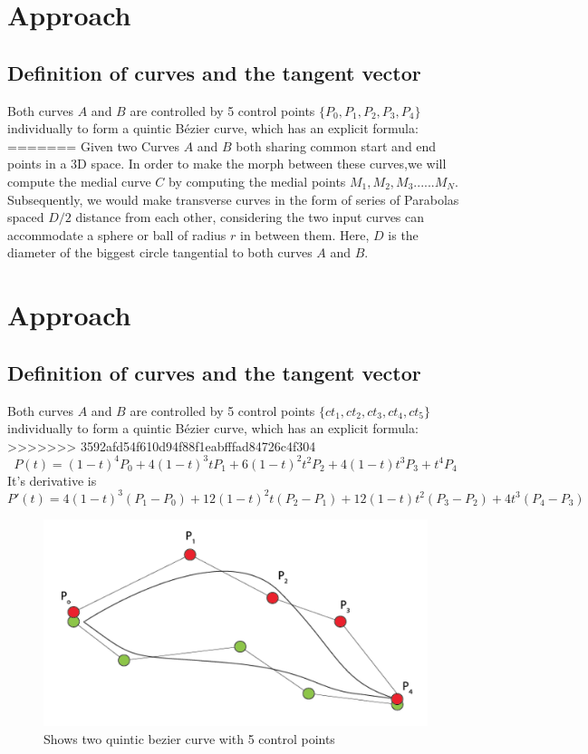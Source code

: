 \documentclass[twoside,11pt]{article}
\begin{document}
\section{Approach}
\subsection{Definition of curves and the tangent vector}
Both curves $A$ and $B$ are controlled by 5 control points  $\{P_0, P_1, P_2, P_3, P_4\}$ individually to form a quintic B\'ezier curve, which has an explicit formula:
=======
Given two Curves $ A $ and $ B $ both sharing common start and end points in a 3D space. In order to make the morph between these curves,we will compute the medial curve $ C $ by computing the medial points $ M_1, M_2, M_3 ......M_N $.
Subsequently, we would make transverse curves in the form of series of Parabolas spaced $ D/2 $ distance from each other, considering the two input curves can accommodate a sphere or ball of radius $ r $ in between them. Here, $D$ is the diameter of the biggest circle tangential to both curves $A$ and $B$.

\section{Approach}
\subsection{Definition of curves and the tangent vector}
Both curves $A$ and $B$ are controlled by 5 control points  $\{ct_1, ct_2, ct_3, ct_4, ct_5\}$ individually to form a quintic B\'ezier curve, which has an explicit formula:
>>>>>>> 3592afd54f610d94f88f1eabfffad84726c4f304
\begin{equation}
  \label{eq:1}
  P(t) = (1-t)^4 P_0 + 4(1-t)^3t P_1 + 6(1-t)^2 t^2 P_2 + 4(1-t)t^3 P_3 + t^4 P_4 
\end{equation}
It's derivative is 
\begin{equation}
  \label{eq:2}
  P'(t) = 4(1-t)^3 (P_1 - P_0) + 12(1-t)^2t (P_2 - P_1) + 12(1-t)t^2 (P_3 - P_2) + 4t^3(P_4 - P_3)
\end{equation}

\begin{figure} [t]
    \centering
    \includegraphics[width=06in]{twoCurves.png}
    \caption{Shows two quintic bezier curve with 5 control points}
\end{figure}
\end{document}
